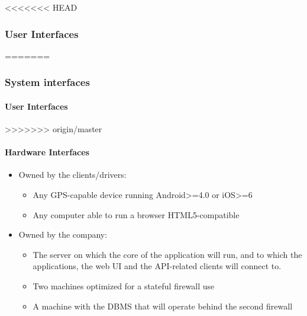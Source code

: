 \documentclass{article}
\begin{document}
<<<<<<< HEAD
\subsubsection{User Interfaces}
=======
\subsubsection{System interfaces}
\paragraph{User Interfaces}
>>>>>>> origin/master

\paragraph{Hardware Interfaces}
\begin{itemize}
\item Owned by the clients/drivers:
	\begin{itemize}
		\item Any GPS-capable device running Android>=4.0 or iOS>=6
		\item Any computer able to run a browser HTML5-compatible
	\end{itemize}
\item Owned by the company:
	\begin{itemize}
		\item The server on which the core of the application will run, and to which the applications, 
			the web UI and the API-related clients will connect to.
		\item Two machines optimized for a stateful firewall use
		\item A machine with the DBMS that will operate behind the second firewall 
	\end{itemize}
\end{itemize}
\end{document}
